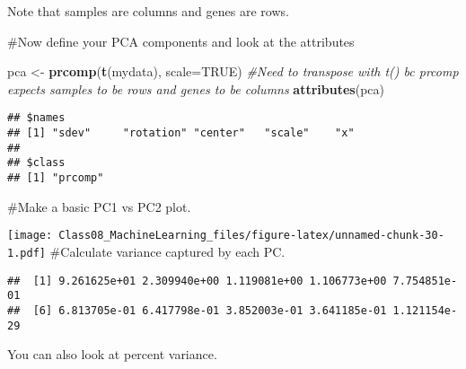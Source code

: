 \documentclass[]{article}
\newenvironment{Shaded}{\begin{snugshade}}{\end{snugshade}}
\newcommand{\CommentTok}[1]{\textcolor[rgb]{0.56,0.35,0.01}{\textit{#1}}}
\newcommand{\DataTypeTok}[1]{\textcolor[rgb]{0.13,0.29,0.53}{#1}}
\newcommand{\DecValTok}[1]{\textcolor[rgb]{0.00,0.00,0.81}{#1}}
\newcommand{\KeywordTok}[1]{\textcolor[rgb]{0.13,0.29,0.53}{\textbf{#1}}}
\newcommand{\NormalTok}[1]{#1}
\newcommand{\OperatorTok}[1]{\textcolor[rgb]{0.81,0.36,0.00}{\textbf{#1}}}
\newcommand{\OtherTok}[1]{\textcolor[rgb]{0.56,0.35,0.01}{#1}}
\newcommand{\StringTok}[1]{\textcolor[rgb]{0.31,0.60,0.02}{#1}}
\begin{document}
Note that samples are columns and genes are rows.

\#Now define your PCA components and look at the attributes

\begin{Shaded}
\begin{Highlighting}[]
\NormalTok{pca <-}\StringTok{ }\KeywordTok{prcomp}\NormalTok{(}\KeywordTok{t}\NormalTok{(mydata), }\DataTypeTok{scale=}\OtherTok{TRUE}\NormalTok{) }\CommentTok{#Need to transpose with t() bc prcomp expects samples to be rows and genes to be columns}
\KeywordTok{attributes}\NormalTok{(pca) }
\end{Highlighting}
\end{Shaded}

\begin{verbatim}
## $names
## [1] "sdev"     "rotation" "center"   "scale"    "x"       
## 
## $class
## [1] "prcomp"
\end{verbatim}

\#Make a basic PC1 vs PC2 plot.

\begin{Shaded}
\end{Shaded}

\texttt{[image: Class08\_MachineLearning\_files/figure-latex/unnamed-chunk-30-1.pdf]}
\#Calculate variance captured by each PC.

\begin{Shaded}
\end{Shaded}

\begin{verbatim}
##  [1] 9.261625e+01 2.309940e+00 1.119081e+00 1.106773e+00 7.754851e-01
##  [6] 6.813705e-01 6.417798e-01 3.852003e-01 3.641185e-01 1.121154e-29
\end{verbatim}

You can also look at percent variance.

\begin{Shaded}
\end{Shaded}
\end{document}

